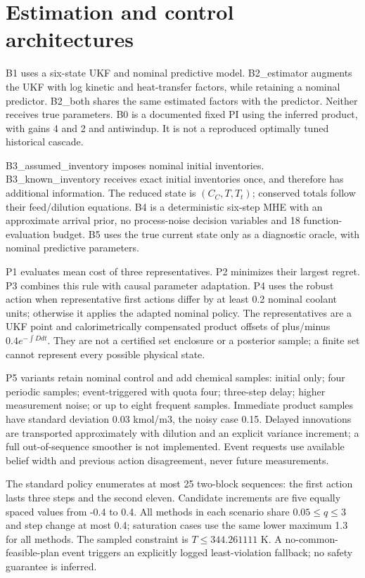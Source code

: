 \documentclass[
  11pt,
]{article}
\begin{document}
\hypertarget{estimation-and-control-architectures}{%
\section{Estimation and control
architectures}\label{estimation-and-control-architectures}}

B1 uses a six-state UKF and nominal predictive model. B2\_estimator
augments the UKF with log kinetic and heat-transfer factors, while
retaining a nominal predictor. B2\_both shares the same estimated
factors with the predictor. Neither receives true parameters. B0 is a
documented fixed PI using the inferred product, with gains 4 and 2 and
antiwindup. It is not a reproduced optimally tuned historical cascade.

B3\_assumed\_inventory imposes nominal initial inventories.
B3\_known\_inventory receives exact initial inventories once, and
therefore has additional information. The reduced state is
\((C_C,T,T_t)\); conserved totals follow their feed/dilution equations.
B4 is a deterministic six-step MHE with an approximate arrival prior, no
process-noise decision variables and 18 function-evaluation budget. B5
uses the true current state only as a diagnostic oracle, with nominal
predictive parameters.

P1 evaluates mean cost of three representatives. P2 minimizes their
largest regret. P3 combines this rule with causal parameter adaptation.
P4 uses the robust action when representative first actions differ by at
least 0.2 nominal coolant units; otherwise it applies the adapted
nominal policy. The representatives are a UKF point and calorimetrically
compensated product offsets of plus/minus \(0.4e^{-\int Ddt}\). They are
not a certified set enclosure or a posterior sample; a finite set cannot
represent every possible physical state.

P5 variants retain nominal control and add chemical samples: initial
only; four periodic samples; event-triggered with quota four; three-step
delay; higher measurement noise; or up to eight frequent samples.
Immediate product samples have standard deviation 0.03 kmol/m3, the
noisy case 0.15. Delayed innovations are transported approximately with
dilution and an explicit variance increment; a full out-of-sequence
smoother is not implemented. Event requests use available belief width
and previous action disagreement, never future measurements.

The standard policy enumerates at most 25 two-block sequences: the first
action lasts three steps and the second eleven. Candidate increments are
five equally spaced values from -0.4 to 0.4. All methods in each
scenario share \(0.05\le q\le3\) and step change at most 0.4; saturation
cases use the same lower maximum 1.3 for all methods. The sampled
constraint is \(T\le344.261111\) K. A no-common-feasible-plan event
triggers an explicitly logged least-violation fallback; no safety
guarantee is inferred.
\end{document}

